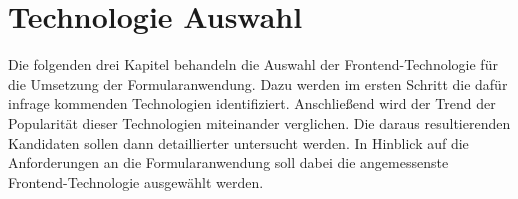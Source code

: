 \chapter{Technologie Auswahl}
\label{chap:Technologie-Auswahl}

Die folgenden drei Kapitel behandeln die Auswahl der Frontend-Technologie für die Umsetzung der Formularanwendung.
Dazu  werden im ersten Schritt die dafür infrage kommenden Technologien identifiziert.
 Anschließend wird der Trend der Popularität dieser Technologien miteinander verglichen.
Die daraus resultierenden Kandidaten sollen dann  detaillierter untersucht werden.
In Hinblick auf die Anforderungen an die Formularanwendung soll dabei die angemessenste Frontend-Technologie ausgewählt werden.






